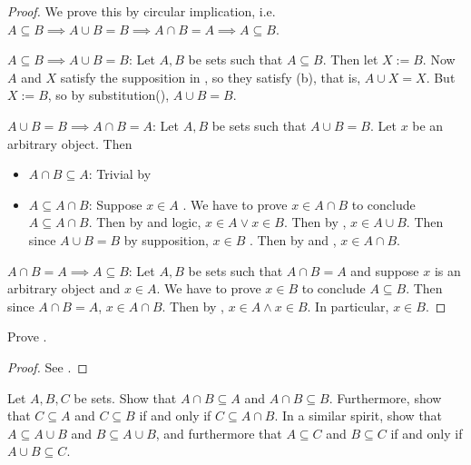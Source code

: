 \begin{proof} We prove this by circular implication, i.e. \(A \subseteq B \implies A \cup B = B \implies A \cap B = A \implies A \subseteq B\).

\(A \subseteq B \implies A \cup B = B\): Let \(A, B\) be sets such that \(A \subseteq B\).
Then let \(X := B\). Now \(A\) and \(X\) satisfy the supposition in , so they satisfy (b), that is, \(A \cup X = X\). But \(X := B\), so by substitution(), \(A \cup B = B\).

\(A \cup B = B \implies A \cap B = A\): Let \(A, B\) be sets such that \(A \cup B = B\). Let \(x\) be an arbitrary object. Then
\begin{itemize}
    \item \(A \cap B \subseteq A\): Trivial by 
    \item \(A \subseteq A \cap B\): Suppose \(x \in A\) . We have to prove \(x \in A \cap B\) to conclude \(A \subseteq A \cap B\). Then by  and logic, \(x \in A \lor x \in B\). Then by , \(x \in A \cup B\). Then since \(A \cup B = B\) by supposition, \(x \in B\) . Then by  and , \(x \in A \cap B\).
\end{itemize}

\(A \cap B = A \implies A \subseteq B\): Let \(A, B\) be sets such that \(A \cap B = A\) and suppose \(x\) is an arbitrary object and \(x \in A\).
We have to prove \(x \in B\) to conclude \(A \subseteq B\).
Then since \(A \cap B = A\), \(x \in A \cap B\).
Then by , \(x \in A \land x \in B\).
In particular, \(x \in B\).
\end{proof}

\begin{exercise}\label{exercise 3.1.6}
    Prove .
\end{exercise}

\begin{proof}
    See .
\end{proof}

\begin{exercise}\label{exercise 3.1.7}
Let \(A, B, C\) be sets. Show that \(A \cap B \subseteq A\) and \(A \cap B \subseteq B\). Furthermore, show that \(C \subseteq A\) and \(C \subseteq B\) if and only if \(C \subseteq A \cap B\). In a similar spirit, show that \(A \subseteq A \cup B\) and \(B \subseteq A \cup B\), and furthermore that \(A \subseteq C\) and \(B \subseteq C\) if and only if \(A \cup B \subseteq C\).
\end{exercise}

